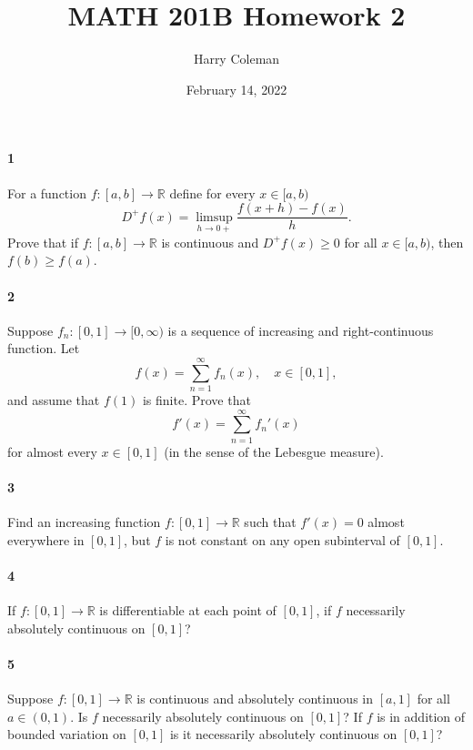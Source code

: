 \documentclass[12pt]{article}
\renewcommand{\maketitle}{\thispagestyle{title}}
\newlength{\myparskip}
\newenvironment{fullbox}{\begin{lrbox}{\savefullbox}\begin{minipage}{\dimexpr\textwidth-2\fboxsep\relax}\setlength{\parskip}{\myparskip}}{\end{minipage}\end{lrbox}\framebox[\textwidth]{\usebox{\savefullbox}}}
\newenvironment{pbox}[1][]{\begin{fullbox}\ifx#1\empty\else\paragraph{#1}\phantom{}\fi}{\end{fullbox}}
\theoremstyle{definition}
\newcommand{\R}{\mathbb{R}}
\newcommand{\<}{\langle}
\renewcommand{\>}{\rangle}
\begin{document}
\title{MATH 201B Homework 2}
\author{Harry Coleman}
\date{February 14, 2022}
\maketitle

\begin{pbox}[1]
    For a function $f : [a, b] \to \R$ define for every $x \in [a, b)$
    \[
        D^+ f(x) = \limsup_{h \to 0+} \frac{f(x + h) - f(x)}{h}.
    \]
    Prove that if $f : [a, b] \to \R$ is continuous and $D^+ f(x) \geq 0$ for all $x \in [a, b)$, then $f(b) \geq f(a)$.
\end{pbox}

\begin{pbox}[2]
    Suppose $f_n : [0, 1] \to [0, \infty)$ is a sequence of increasing and right-continuous function.
    Let
    \[
        f(x) = \sum_{n=1}^{\infty} f_n(x), \quad x \in [0, 1],
    \]
    and assume that $f(1)$ is finite.
    Prove that
    \[
        f'(x) = \sum_{n=1}^{\infty} f_n'(x)
    \]
    for almost every $x \in [0, 1]$ (in the sense of the Lebesgue measure).
\end{pbox}

\begin{pbox}[3]
    Find an increasing function $f : [0, 1] \to \R$ such that $f'(x) = 0$ almost everywhere in $[0, 1]$, but $f$ is not constant on any open subinterval of $[0, 1]$.
\end{pbox}

\begin{pbox}[4]
    If $f : [0, 1] \to \R$ is differentiable at each point of $[0, 1]$, if $f$ necessarily absolutely continuous on $[0, 1]$?
\end{pbox}

\begin{pbox}[5]
    Suppose $f : [0, 1] \to \R$ is continuous and absolutely continuous in $[a, 1]$ for all $a \in (0, 1)$.
    Is $f$ necessarily absolutely continuous on $[0, 1]$?
    If $f$ is in addition of bounded variation on $[0, 1]$ is it necessarily absolutely continuous on $[0, 1]$?
\end{pbox}
\end{document}
